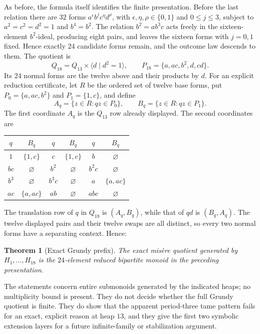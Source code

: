 \documentclass[11pt]{article}
\newtheorem{theorem}{Theorem}[section]
\theoremstyle{definition}
\theoremstyle{remark}
\begin{document}
As before, the formula itself identifies the finite presentation.  Before
the last relation there are $32$ forms
$a^\epsilon b^j c^\eta d^\rho$, with
$\epsilon,\eta,\rho\in\{0,1\}$ and $0\le j\le3$, subject to
$a^2=c^2=d^2=1$ and $b^4=b^2$.  The relation
$b^2=ab^3c$ acts freely in the sixteen-element $b^2$-ideal, producing eight
pairs, and leaves the sixteen forms with $j=0,1$ fixed.  Hence exactly
$24$ candidate forms remain, and the outcome law descends to them.  The
quotient is
\begin{equation}
 Q_{18}=Q_{13}\times\langle d\mid d^2=1\rangle,
 \qquad P_{18}=\{a,ac,b^2,d,cd\}.
\end{equation}
Its $24$ normal forms are the twelve above and their products by $d$.
For an explicit reduction certificate, let $R$ be the ordered set of twelve
base forms, put $P_0=\{a,ac,b^2\}$ and $P_1=\{1,c\}$, and define
\[
 A_q=\{z\in R:qz\in P_0\},\qquad
 B_q=\{z\in R:qz\in P_1\}.
\]
The first coordinate $A_q$ is the $Q_{13}$ row already displayed.  The
second coordinates are
\begin{center}
\small
\begin{tabular}{c@{\;}c@{\qquad}c@{\;}c@{\qquad}c@{\;}c}
\toprule
$q$&$B_q$&$q$&$B_q$&$q$&$B_q$\\
\midrule
$1$&$\{1,c\}$&$c$&$\{1,c\}$&$b$&$\varnothing$\\
$bc$&$\varnothing$&$b^2$&$\varnothing$&$b^2c$&$\varnothing$\\
$b^3$&$\varnothing$&$b^3c$&$\varnothing$&$a$&$\{a,ac\}$\\
$ac$&$\{a,ac\}$&$ab$&$\varnothing$&$abc$&$\varnothing$\\
\bottomrule
\end{tabular}
\end{center}
The translation row of $q$ in $Q_{18}$ is $(A_q,B_q)$, while that of $qd$
is $(B_q,A_q)$.  The twelve displayed pairs and their twelve swaps are all
distinct, so every two normal forms have a separating context.  Hence:

\begin{theorem}[Exact Grundy prefix]\label{thm:grundy18}
The exact mis\`ere quotient generated by $H_1,\ldots,H_{18}$ is the
$24$-element reduced bipartite monoid in the preceding presentation.
\end{theorem}

The statements concern entire submonoids generated by the indicated heaps;
no multiplicity bound is present.  They do not decide whether the full
Grundy quotient is finite.  They do show that the apparent period-three
tame pattern fails for an exact, explicit reason at heap $13$, and they give
the first two symbolic extension layers for a future infinite-family or
stabilization argument.
\end{document}
